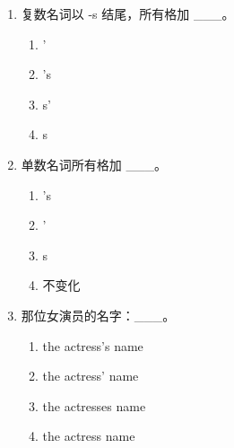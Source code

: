 \documentclass[11pt,a4paper]{ctexart}
\begin{document}
\begin{enumerate}[leftmargin=*,itemsep=4pt]
\begin{enumerate}[label=\Alph*.,leftmargin=2em,itemsep=1pt,topsep=2pt]
\item Alice vlog
\item Alices’ vlog
\end{enumerate}
\item 复数名词以 -s 结尾，所有格加 \_\_\_。
\begin{enumerate}[label=\Alph*.,leftmargin=2em,itemsep=1pt,topsep=2pt]
\item ’
\item ’s
\item s’
\item s
\end{enumerate}
\item 单数名词所有格加 \_\_\_。
\begin{enumerate}[label=\Alph*.,leftmargin=2em,itemsep=1pt,topsep=2pt]
\item ’s
\item ’
\item s
\item 不变化
\end{enumerate}
\item 那位女演员的名字：\_\_\_。
\begin{enumerate}[label=\Alph*.,leftmargin=2em,itemsep=1pt,topsep=2pt]
\item the actress’s name
\item the actress’ name
\item the actresses name
\item the actress name
\end{enumerate}
\end{enumerate}
\end{document}
